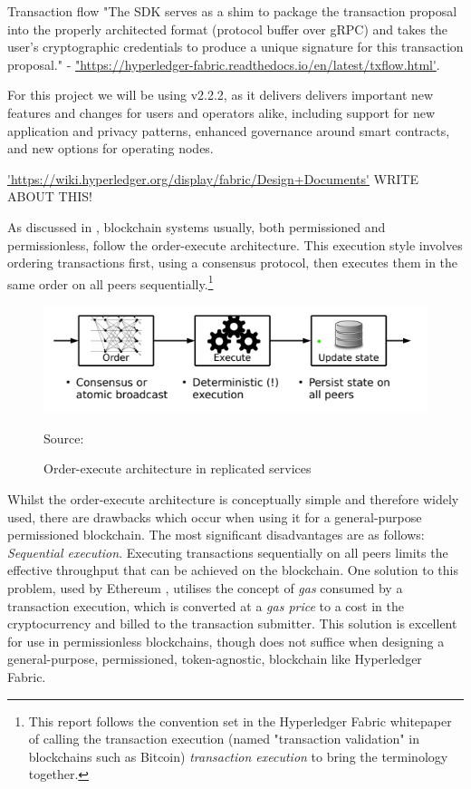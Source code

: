 \documentclass{report}
\newcommand{\source}[1]{\caption*{Source: {#1}} }
\begin{document}
\begin{flushleft}
Transaction flow "The SDK serves as a shim to package the transaction proposal into the properly architected format (protocol buffer over gRPC) and takes the user’s cryptographic credentials to produce a unique signature for this transaction proposal." - \url{"https://hyperledger-fabric.readthedocs.io/en/latest/txflow.html'}.\linebreak[1]

For this project we will be using v2.2.2, as it delivers delivers important new features and changes for users and operators alike, including support for new application and privacy patterns, enhanced governance around smart contracts, and new options for operating nodes. \cite{noauthor_whats_nodate}

\url{'https://wiki.hyperledger.org/display/fabric/Design+Documents'} WRITE ABOUT THIS!

As discussed in \cite{androulaki_hyperledger_2018}, blockchain systems usually, both permissioned and permissionless, follow the order-execute architecture. This execution style involves ordering transactions first, using a consensus protocol, then executes them in the same order on all peers sequentially.\footnote{This report follows the convention set in the Hyperledger Fabric whitepaper of calling the transaction execution (named "transaction validation" in blockchains such as Bitcoin) \emph{transaction execution} to bring the terminology together.}
\begin{figure}[h]
  \includegraphics[scale=0.9]{order-execute}
  \caption{Order-execute architecture in replicated services}
  \source{\cite{androulaki_hyperledger_2018}}
\end{figure}

Whilst the order-execute architecture is conceptually simple and therefore widely used, there are drawbacks which occur when using it for a general-purpose permissioned blockchain.\cite{androulaki_hyperledger_2018}
The most significant disadvantages are as follows: 
\emph{Sequential execution}. Executing transactions sequentially on all peers limits the effective throughput that can be achieved on the blockchain.\cite{androulaki_hyperledger_2018} 
One solution to this problem, used by Ethereum \cite{wood_ethereum_nodate}, utilises the concept of \emph{gas} consumed by a transaction execution, which is converted at a \emph{gas price} to a cost in the cryptocurrency and billed to the transaction submitter.
This solution is excellent for use in permissionless blockchains, though does not suffice when designing a general-purpose, permissioned, token-agnostic, blockchain like Hyperledger Fabric. \cite{androulaki_hyperledger_2018}


\end{flushleft}
\end{document}
